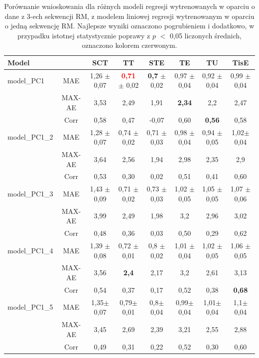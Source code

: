 \begin{table}[h!]
	\caption{Porównanie wnioskowania dla różnych modeli regresji wytrenowanych w oparciu o dane z 3-ech sekwencji RM, z modelem liniowej regresji wytrenowanym w oparciu o jedną sekwencję RM. Najlepsze wyniki oznaczono pogrubieniem i dodatkowo, w przypadku istotnej statystycznie poprawy z $p$ $<$ 0,05 liczonych średnich, oznaczono kolorem czerwonym.}
	\scriptsize
	\begin{center}
		\begin{tabular}{lc||c|c|c|c|c|c}
			\textbf{Model} & & \textbf{SCT} & \textbf{TT} & \textbf{STE} & \textbf{TE} & \textbf{TU} & \textbf{TisE}\\ 
			
			\hline \hline
			model\_PC1 & MAE & 1,26 $\pm$ 0,07 & \textcolor{red}{\textbf{0,71}} $\pm$ 0,02 & \textbf{0,7} $\pm$ 0,02 & 0,97 $\pm$ 0,04 & 0,92 $\pm$ 0,04 & 0,99 $\pm$ 0,04\\
			&MAX-AE &3,53&2,49&1,91&\textbf{2,34}&2,2&2,47\\
			&Corr &0,58&0,47&-0,07&0,60&\textbf{0,56}&0,58\\
			
			\hline
			model\_PC1\_2 & MAE & 1,28 $\pm$ 0,07 & 0,74 $\pm$ 0,02 & 0,71 $\pm$ 0,03 & 0,98 $\pm$ 0,04 & 0,94 $\pm$ 0,05 & 1,02$\pm$ 0,04\\
			&MAX-AE &3,64&2,56&1,94&2,98&2,35&2,9\\
			&Corr &0,53&0,30&0,02&0,51&0,41&0,60\\
			
			\hline
			model\_PC1\_3&MAE & 1,43 $\pm$ 0,09 & 0,71 $\pm$ 0,02 & 0,73 $\pm$ 0,03 & 1,02 $\pm$ 0,05 & 1,05 $\pm$ 0,05 & 1,07 $\pm$ 0,06\\
			&MAX-AE &3,99&2,49&1,98&3,2&2,96&3,02\\
			&Corr &0,48&0,36&0,03&0,50&0,29&0,62\\
			
			\hline
			model\_PC1\_4&MAE & 1,39 $\pm$ 0,08 & 0,72 $\pm$ 0,01 & 0,8 $\pm$ 0,02 & 1,01 $\pm$ 0,04 & 1,02 $\pm$ 0,05 & 1,06 $\pm$ 0,05\\
			&MAX-AE &3,56&\textbf{2,4}&2,17&3,2&2,61&3,13\\
			&Corr &0,54&0,37&0,17&0,52&0,38&\textbf{0,68}\\
			
			\hline
			model\_PC1\_5&MAE & 1,35$\pm$ 0,07 & 0,79$\pm$0,01 &0,8$\pm$0,04 &0,99$\pm$0,04 &1,01$\pm$0,04 &1,1$\pm$0,04\\
			&MAX-AE &3,45&2,69&2,39&3,21&2,55&2,88\\
			&Corr &0,49&0,31&0,22&0,52&0,30&0,60\\
			

\end{tabular}
\end{center}
\end{table}
